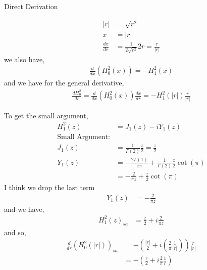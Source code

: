 \documentclass{article}
\newcommand{\0}{\varnothing}
\begin{document}
\begin{minipage}[t]{0.5\textwidth}
{\centering Direct Derivation\ \\}

\begin{align*}
    |r| &= \sqrt{r^2}\\
    x &= |r| \\
    \frac{dx}{dr} &= \frac{1}{2 \sqrt{r^2}} 2 r = \frac{r}{|r|}
\end{align*}
we also have,
\begin{align*}
    \frac{d}{dx}(H_0^2 (x)) = -H_1^2(x)
\end{align*}
and we have for the general derivative,
\begin{align*}
    \frac{dH_0^2}{dr} = \frac{d}{dx}(H_0^2 (x)) \frac{dx}{dr} = -H_1^2(|r|) \frac{r}{|r|}
\end{align*}

To get the small argument, 
\begin{align*}
    H_1^2(z) &= J_1(z) - i Y_1(z) \\
    \text{Small Argument:}& \\
    J_1(z) &= \frac{1}{\Gamma(2)} \frac{z}{2} = \frac{z}{2}\\
    Y_1(z) &= -\frac{2\Gamma(1)}{z\pi} + \frac{1}{\Gamma(2)} \frac{z}{2} \cot(\pi) \\
           &= -\frac{2}{\pi z} + \frac{z}{2} \cot(\pi)
\end{align*}
I think we drop the last term
\begin{align*}
     Y_1(z) &= -\frac{2}{\pi z}
\end{align*}
and we have,
\begin{align*}
     H_1^2(z)_{sa} &= \frac{z}{2} + i  \frac{2}{\pi z}
\end{align*}
and so,  
\begin{align*}
    \frac{d}{dr} \left( H_0^2(|r|) \right)_{sa} &= -\left(\frac{|r|}{2} + i \left(\frac{2}{\pi} \frac{1}{|r|} \right)\right) \frac{r}{|r|}\\
    &= -\left(\frac{r}{2} + i \frac{2}{\pi} \frac{1}{r} \right)
\end{align*}

\end{minipage}
\end{document}
